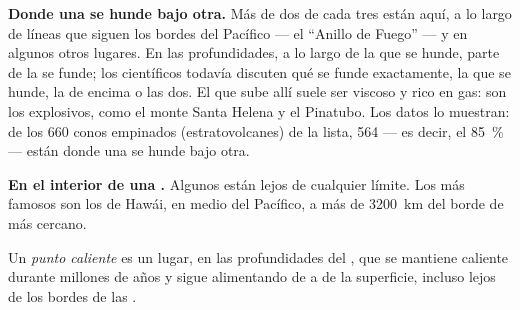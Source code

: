 \textbf{Donde una  se hunde bajo otra.} Más de dos  de cada
tres están aquí, a lo largo de líneas que siguen los bordes del 
Pacífico --- el ``Anillo de Fuego'' --- y en algunos otros lugares. En las
profundidades, a lo largo de la  que se hunde, parte de la  se
funde; los científicos todavía discuten qué  se funde exactamente, la
 que se hunde, la  de encima o las dos. El  que sube allí
suele ser viscoso y rico en gas: son los  explosivos, como el monte
Santa Helena y el Pinatubo. Los datos lo muestran: de los 660 conos
empinados (estratovolcanes) de la lista, 564 --- es decir, el
85~\% --- están donde una  se hunde bajo otra.

\textbf{En el interior de una .} Algunos  están lejos de
cualquier límite. Los más famosos son los de Hawái, en medio del 
Pacífico, a más de \qty{3200}{km} del borde de  más cercano.

\begin{definition}\label{def:g7:volcanoes:hotspot}
Un \emph{punto caliente} es un lugar, en las
profundidades del , que se mantiene caliente durante millones de años
y sigue alimentando de  a  de la superficie, incluso lejos de
los bordes de las .
\end{definition}

